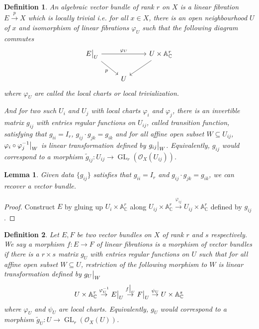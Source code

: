 \documentclass{ctexart}
\newtheorem{definition}{Definition}[section]
\newtheorem{lemma}{Lemma}[section]
\newcommand{\generallineargroup}[2]{\operatorname{GL}_{#1}(#2)}
\begin{document}
\begin{definition}
    An algebraic vector bundle of rank $r$ on $X$ is a linear fibration $E \overset{p}{\rightarrow} X$ which is locally trivial i.e. for all $x\in X$,
    there is an open neighbourhood $U$ of $x$ and isomorphism of linear fibrations $\varphi_{U}$ such that the following diagram commutes
    \begin{equation}
        \begin{tikzcd}
            E\big{|}_{U} \arrow[rr, "\varphi_{U}"] \arrow[dr, "p" swap] &&
            U \times \mathbb{A}_{\mathbb{C}}^{r} \arrow[dl] \\
            & U &
        \end{tikzcd}
    \end{equation}
    where $\varphi_{U}$ are called the local charts or local trivialization.
    \par
    And for two such $U_{i}$ and $U_{j}$ with local charts $\varphi_{i}$ and $\varphi_{j}$,
    there is an invertible matrix $g_{ij}$ with entries regular functions on $U_{ij}$, called transition function,
    satisfying that $g_{ii} = I_{r}$, $g_{ij} \cdot g_{jk} = g_{ik}$ and for all affine open subset $W \subseteq U_{ij}$,
    $\varphi_{i} \circ \varphi_{j}^{-1}\big{|}_{W}$ is linear transformation defined by $g_{ij}\big{|}_{W}$.
    Equivalently, $g_{ij}$ would correspond to a morphism $\widetilde{g}_{ij}: U_{ij} \rightarrow \generallineargroup{r}{\mathcal{O}_{X}(U_{ij})}$.
\end{definition}
\begin{lemma}
    Given data $\{g_{ij}\}$ satisfies that $g_{ii} = I_{r}$ and $g_{ij} \cdot g_{jk} = g_{ik}$, we can recover a vector bundle.
    \label{Lemma 1.5}
\end{lemma}
\begin{proof}
    Construct $E$ by gluing up $U_{i} \times \mathbb{A}_{\mathbb{C}}^{r}$ along $U_{ij} \times \mathbb{A}_{\mathbb{C}}^{r} \overset{\varphi_{ij}}{\rightarrow} U_{ij} \times \mathbb{A}_{\mathbb{C}}^{r}$ defined by $g_{ij}$.
\end{proof}
\begin{definition}
    Let $E, F$ be two vector bundles on $X$ of rank $r$ and $s$ respectively.
    We say a morphism $f: E \rightarrow F$ of linear fibrations is a morphism of vector bundles if there is a $r \times s$ matrix $g_{U}$ with entries regular functions on $U$ such that for all affine open subset $W \subseteq U$, 
    restriction of the following morphism to $W$ is linear transformation defined by $g_{U}\big{|}_{W}$
    \begin{equation}
        U \times \mathbb{A}_{\mathbb{C}}^{r} \overset{\varphi_{U}^{-1}}{\rightarrow} E\big{|}_{U} \overset{f\big{|}_{U}}{\rightarrow} F\big{|}_{U} \overset{\psi_{U}}{\rightarrow} U \times \mathbb{A}_{\mathbb{C}}^{s}
    \end{equation}
    where $\varphi_{U}$ and $\psi_{U}$ are local charts.
    Equivalently, $g_{U}$ would correspond to a morphism $\widetilde{g}_{U}: U \rightarrow \generallineargroup{r}{\mathcal{O}_{X}(U)}$.
\end{definition}
\end{document}
